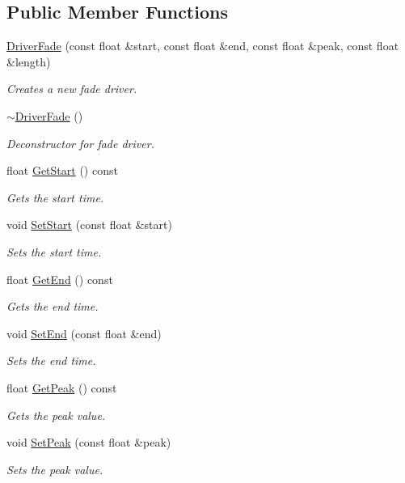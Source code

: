 \subsection*{Public Member Functions}
\begin{DoxyCompactItemize}
\item 
\hyperlink{class_flounder_1_1_driver_fade_a47a59ade66edc424073078463ee2d9df}{Driver\+Fade} (const float \&start, const float \&end, const float \&peak, const float \&length)
\begin{DoxyCompactList}\small\item\em Creates a new fade driver. \end{DoxyCompactList}\item 
\hyperlink{class_flounder_1_1_driver_fade_acfd8899cdd328a0d7a24a3b8b6b20bdb}{$\sim$\+Driver\+Fade} ()
\begin{DoxyCompactList}\small\item\em Deconstructor for fade driver. \end{DoxyCompactList}\item 
float \hyperlink{class_flounder_1_1_driver_fade_a94ad7197e044e6f2ea2b8ada7d3174a1}{Get\+Start} () const
\begin{DoxyCompactList}\small\item\em Gets the start time. \end{DoxyCompactList}\item 
void \hyperlink{class_flounder_1_1_driver_fade_a24d8c27ded31c31ef2efc66bbee1ae0e}{Set\+Start} (const float \&start)
\begin{DoxyCompactList}\small\item\em Sets the start time. \end{DoxyCompactList}\item 
float \hyperlink{class_flounder_1_1_driver_fade_aff927a9896a8ac1a96a7000b99668082}{Get\+End} () const
\begin{DoxyCompactList}\small\item\em Gets the end time. \end{DoxyCompactList}\item 
void \hyperlink{class_flounder_1_1_driver_fade_a944b5327889098faecd497b1d983f2cc}{Set\+End} (const float \&end)
\begin{DoxyCompactList}\small\item\em Sets the end time. \end{DoxyCompactList}\item 
float \hyperlink{class_flounder_1_1_driver_fade_afb8148672da9d2fbf3d1fd5624af06fe}{Get\+Peak} () const
\begin{DoxyCompactList}\small\item\em Gets the peak value. \end{DoxyCompactList}\item 
void \hyperlink{class_flounder_1_1_driver_fade_a9d5a179f9a0f5d500176291020bd406d}{Set\+Peak} (const float \&peak)
\begin{DoxyCompactList}\small\item\em Sets the peak value. \end{DoxyCompactList}\end{DoxyCompactItemize}
